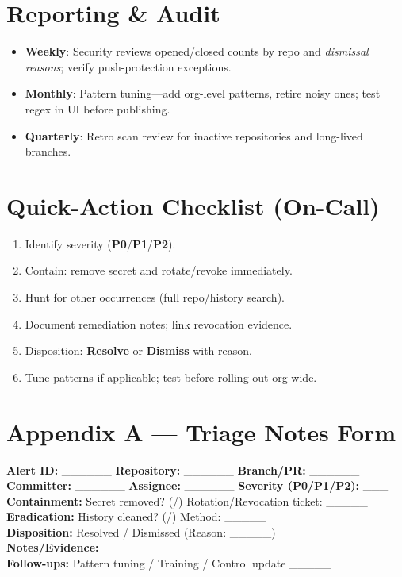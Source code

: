 \documentclass[11pt,a4paper]{article}
\renewcommand{\cmark}{\ding{51}}
\renewcommand{\xmark}{\ding{55}}
\begin{document}
\section{Reporting \& Audit}
\begin{itemize}[leftmargin=1.2em]
  \item \textbf{Weekly}: Security reviews opened/closed counts by repo and \emph{dismissal reasons}; verify push-protection exceptions.
  \item \textbf{Monthly}: Pattern tuning---add org-level patterns, retire noisy ones; test regex in UI before publishing.
  \item \textbf{Quarterly}: Retro scan review for inactive repositories and long-lived branches.
\end{itemize}

\section{Quick-Action Checklist (On-Call)}
\begin{enumerate}[leftmargin=1.2em]
  \item Identify severity (\textbf{P0}/\textbf{P1}/\textbf{P2}).
  \item Contain: remove secret and rotate/revoke immediately.
  \item Hunt for other occurrences (full repo/history search).
  \item Document remediation notes; link revocation evidence.
  \item Disposition: \textbf{Resolve} or \textbf{Dismiss} with reason.
  \item Tune patterns if applicable; test before rolling out org-wide.
\end{enumerate}

\section*{Appendix A --- Triage Notes Form}
\begin{ghascallout}
\textbf{Alert ID:} \_\_\_\_\_\_ \quad \textbf{Repository:} \_\_\_\_\_\_ \quad \textbf{Branch/PR:} \_\_\_\_\_\_\\
\textbf{Committer:} \_\_\_\_\_\_ \quad \textbf{Assignee:} \_\_\_\_\_\_ \quad \textbf{Severity (P0/P1/P2):} \_\_\_\\[2mm]
\textbf{Containment:} Secret removed? (\cmark/\xmark) \quad Rotation/Revocation ticket: \_\_\_\_\_\\[2mm]
\textbf{Eradication:} History cleaned? (\cmark/\xmark) \quad Method: \_\_\_\_\_\\[2mm]
\textbf{Disposition:} Resolved / Dismissed (Reason: \_\_\_\_\_)\\[2mm]
\textbf{Notes/Evidence:} \hrulefill\\[2mm]
\textbf{Follow-ups:} Pattern tuning / Training / Control update \_\_\_\_\_
\end{ghascallout}
\end{document}

